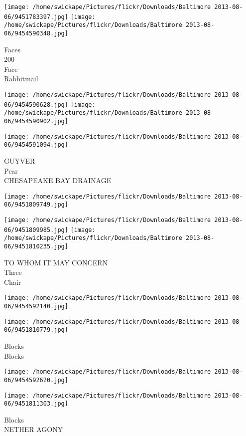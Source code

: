 \documentclass[10pt,letterpaper]{article}
\begin{document}
\texttt{[image: /home/swickape/Pictures/flickr/Downloads/Baltimore 2013-08-06/9451783397.jpg]}
\texttt{[image: /home/swickape/Pictures/flickr/Downloads/Baltimore 2013-08-06/9454590348.jpg]}

Faces\\
200\\
Face\\
Rabbitmail
\pagebreak

\texttt{[image: /home/swickape/Pictures/flickr/Downloads/Baltimore 2013-08-06/9454590628.jpg]}
\texttt{[image: /home/swickape/Pictures/flickr/Downloads/Baltimore 2013-08-06/9454590902.jpg]}

\vspace{0.25in}
\texttt{[image: /home/swickape/Pictures/flickr/Downloads/Baltimore 2013-08-06/9454591094.jpg]}

GUYVER\\
Pear\\
CHESAPEAKE BAY DRAINAGE
\pagebreak

\texttt{[image: /home/swickape/Pictures/flickr/Downloads/Baltimore 2013-08-06/9451809749.jpg]}

\vspace{0.25in}
\texttt{[image: /home/swickape/Pictures/flickr/Downloads/Baltimore 2013-08-06/9451809985.jpg]}
\texttt{[image: /home/swickape/Pictures/flickr/Downloads/Baltimore 2013-08-06/9451810235.jpg]}

TO WHOM IT MAY CONCERN\\
Three\\
Chair
\pagebreak

\texttt{[image: /home/swickape/Pictures/flickr/Downloads/Baltimore 2013-08-06/9454592140.jpg]}

\vspace{0.25in}
\texttt{[image: /home/swickape/Pictures/flickr/Downloads/Baltimore 2013-08-06/9451810779.jpg]}

Blocks\\
Blocks
\pagebreak

\texttt{[image: /home/swickape/Pictures/flickr/Downloads/Baltimore 2013-08-06/9454592620.jpg]}

\vspace{0.25in}
\texttt{[image: /home/swickape/Pictures/flickr/Downloads/Baltimore 2013-08-06/9451811303.jpg]}

Blocks\\
NETHER AGONY
\pagebreak
\end{document}
